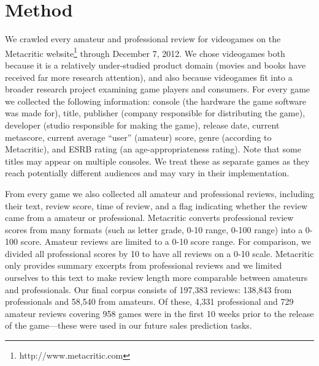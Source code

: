 \documentclass{sig-alternate}
\begin{document}
\section{Method}

We crawled every amateur and professional review for videogames on the
Metacritic website\footnote{http://www.metacritic.com} through December
7, 2012. We chose videogames both because it is a relatively
under-studied product domain (movies and books have received far more
research attention), and also because videogames fit into a broader
research project examining game players and consumers. 
For every game we collected the following information: console (the
hardware the game software was made for), title, publisher (company
responsible for distributing the game), developer (studio responsible
for making the game), release date, current metascore, current average
``user'' (amateur) score, genre (according to Metacritic), and ESRB
rating (an age-appropriateness rating). Note that some titles may appear on multiple consoles. We treat these as separate games as they reach potentially different audiences and may vary in their implementation. 

From every game we also collected all amateur and professional reviews,
including their text, review score, time of review, and a flag
indicating whether the review came from a amateur or professional.
Metacritic converts professional review scores from many formats (such
as letter grade, 0-10 range, 0-100 range) into a 0-100 score. Amateur
reviews are limited to a 0-10 score range. For comparison, we divided all professional scores by 10 to have all reviews on a 0-10 scale. Metacritic only provides summary excerpts from professional reviews and we limited ourselves to this text to make review length more comparable between amateurs and professionals. Our final corpus consists of 197,383 reviews: 138,843 from professionals and 58,540 from amateurs. Of these, 4,331 professional and 729 amateur reviews covering 958 games were in the first 10 weeks prior to the release of the game---these were used in our future sales prediction tasks.
\end{document}
